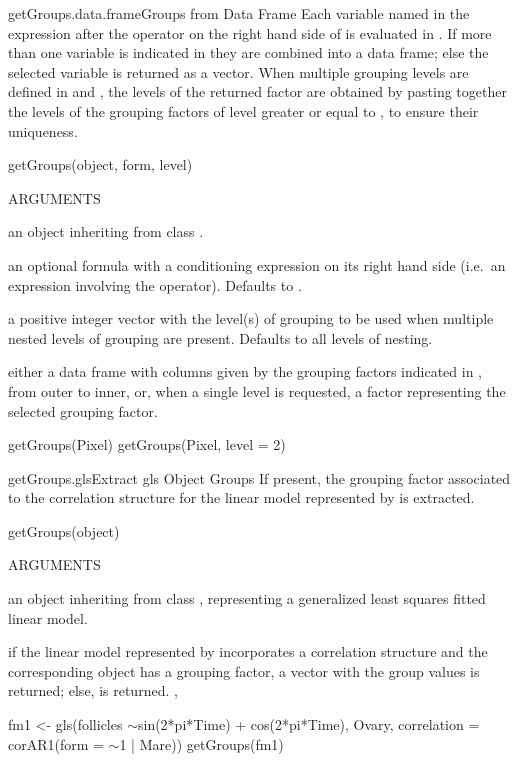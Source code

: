 \documentclass[pdftex]{article} \usepackage{url,graphicx}
\renewcommand{\Twiddle}{\mbox{\(\sim\)}}
\begin{document}
\begin{Helpfile}{getGroups.data.frame}{Groups from Data Frame}
Each variable named in the expression after the \Co{|} operator on
the right hand side of  is evaluated in . If
more than one variable is indicated in  they are combined
into a data frame; else the selected variable is returned as a vector.
When multiple grouping levels are defined in  and
, the levels of the returned factor are obtained by
pasting together the levels of the grouping factors of level greater
or equal to , to ensure their uniqueness.
\begin{Example}
getGroups(object, form, level)
\end{Example}
\begin{Argument}{ARGUMENTS}
\item[\Co{object:}]
an object inheriting from class .
\item[\Co{form:}]
an optional formula with a conditioning expression on its
right hand side (i.e.\ an expression involving the \Co{|}
operator). Defaults to .
\item[\Co{level:}]
a positive integer vector with the level(s) of grouping to
be used when multiple nested levels of grouping are present. Defaults
to all levels of nesting.
\end{Argument}
either a data frame with columns given by the grouping factors
indicated in , from outer to inner, or, when a single
level is requested, a factor representing the selected grouping
factor.
\need 15pt
\vspace{-16pt} 
\begin{Example}
getGroups(Pixel)
getGroups(Pixel, level = 2)
\end{Example}
\end{Helpfile}
\begin{Helpfile}{getGroups.gls}{Extract gls Object Groups}
If present, the grouping factor associated to the correlation
structure for the linear model represented by  is extracted.
\begin{Example}
getGroups(object)
\end{Example}
\begin{Argument}{ARGUMENTS}
\item[\Co{object:}]
an object inheriting from class , representing
a generalized least squares fitted linear model.
\end{Argument}
if the linear model represented by  incorporates a
correlation structure and the corresponding  object
has a grouping factor, a vector with the group values is returned;
else,  is returned.
, 
\need 15pt
\vspace{-16pt} 
\begin{Example}
fm1 <- gls(follicles \Twiddle sin(2*pi*Time) + cos(2*pi*Time), Ovary,
           correlation = corAR1(form = \Twiddle 1 | Mare))
getGroups(fm1)
\end{Example}
\end{Helpfile}
\end{document}
